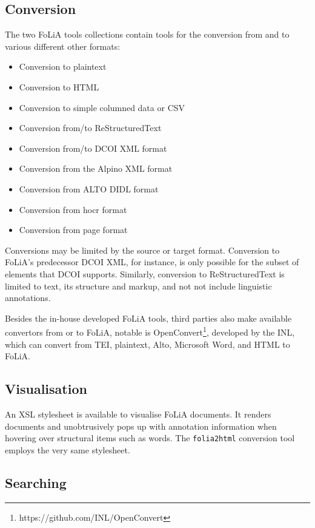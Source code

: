 \subsection{Conversion}

The two FoLiA tools collections contain tools for the conversion from and to
various different other formats:

\begin{itemize}
    \item Conversion to plaintext
    \item Conversion to HTML
    \item Conversion to simple columned data or CSV
    \item Conversion from/to ReStructuredText
    \item Conversion from/to DCOI XML format
    \item Conversion from the Alpino XML format
    \item Conversion from ALTO DIDL format %
    \item Conversion from hocr format  %
    \item Conversion from page format  %
\end{itemize}

Conversions may be limited by the source or target format. Conversion to
FoLiA's predecessor DCOI XML, for instance, is only possible for the subset of
elements that DCOI supports. Similarly, conversion to ReStructuredText is
limited to text, its structure and markup, and not not include linguistic
annotations.

Besides the in-house developed FoLiA tools, third parties also make available
convertors from or to FoLiA, notable is
OpenConvert\footnote{https://github.com/INL/OpenConvert}, developed by the INL,
which can convert from TEI, plaintext, Alto, Microsoft Word, and HTML to
FoLiA.

\subsection{Visualisation}

An XSL stylesheet is available to visualise FoLiA documents. It renders
documents and unobtrusively pops up with annotation information when hovering
over structural items such as words. The \texttt{folia2html} conversion tool
employs the very same stylesheet.

\subsection{Searching}

